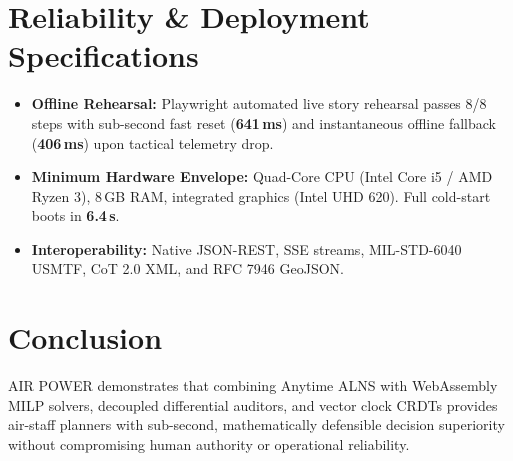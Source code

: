 \documentclass[10pt,twocolumn,a4paper]{article}
\begin{document}
\section{Reliability \& Deployment Specifications}
\footnotesize
\begin{itemize}
    \item \textbf{Offline Rehearsal:} Playwright automated live story rehearsal passes 8/8 steps with sub-second fast reset (\textbf{641\,ms}) and instantaneous offline fallback (\textbf{406\,ms}) upon tactical telemetry drop.
    \item \textbf{Minimum Hardware Envelope:} Quad-Core CPU (Intel Core i5 / AMD Ryzen 3), 8\,GB RAM, integrated graphics (Intel UHD 620). Full cold-start boots in \textbf{6.4\,s}.
    \item \textbf{Interoperability:} Native JSON-REST, SSE streams, MIL-STD-6040 USMTF, CoT 2.0 XML, and RFC 7946 GeoJSON.
\end{itemize}

\vspace{-0.5em}
\section{Conclusion}
\footnotesize
AIR POWER demonstrates that combining Anytime ALNS with WebAssembly MILP solvers, decoupled differential auditors, and vector clock CRDTs provides air-staff planners with sub-second, mathematically defensible decision superiority without compromising human authority or operational reliability.
\end{document}
